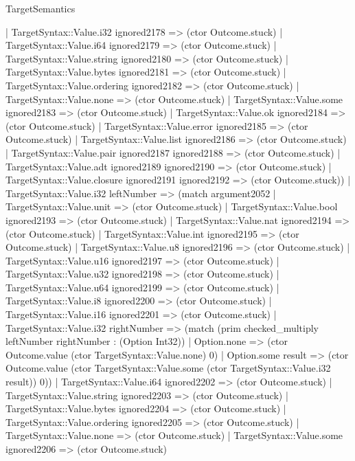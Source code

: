 \begin{lexlean}{TargetSemantics}
\begin{semanticmodule}
{              | TargetSyntax::Value.i32 ignored2178 => (ctor Outcome.stuck)
              | TargetSyntax::Value.i64 ignored2179 => (ctor Outcome.stuck)
              | TargetSyntax::Value.string ignored2180 => (ctor Outcome.stuck)
              | TargetSyntax::Value.bytes ignored2181 => (ctor Outcome.stuck)
              | TargetSyntax::Value.ordering ignored2182 => (ctor Outcome.stuck)
              | TargetSyntax::Value.none => (ctor Outcome.stuck)
              | TargetSyntax::Value.some ignored2183 => (ctor Outcome.stuck)
              | TargetSyntax::Value.ok ignored2184 => (ctor Outcome.stuck)
              | TargetSyntax::Value.error ignored2185 => (ctor Outcome.stuck)
              | TargetSyntax::Value.list ignored2186 => (ctor Outcome.stuck)
              | TargetSyntax::Value.pair ignored2187 ignored2188 => (ctor Outcome.stuck)
              | TargetSyntax::Value.adt ignored2189 ignored2190 => (ctor Outcome.stuck)
              | TargetSyntax::Value.closure ignored2191 ignored2192 => (ctor Outcome.stuck))
            | TargetSyntax::Value.i32 leftNumber => (match argument2052
              | TargetSyntax::Value.unit => (ctor Outcome.stuck)
              | TargetSyntax::Value.bool ignored2193 => (ctor Outcome.stuck)
              | TargetSyntax::Value.nat ignored2194 => (ctor Outcome.stuck)
              | TargetSyntax::Value.int ignored2195 => (ctor Outcome.stuck)
              | TargetSyntax::Value.u8 ignored2196 => (ctor Outcome.stuck)
              | TargetSyntax::Value.u16 ignored2197 => (ctor Outcome.stuck)
              | TargetSyntax::Value.u32 ignored2198 => (ctor Outcome.stuck)
              | TargetSyntax::Value.u64 ignored2199 => (ctor Outcome.stuck)
              | TargetSyntax::Value.i8 ignored2200 => (ctor Outcome.stuck)
              | TargetSyntax::Value.i16 ignored2201 => (ctor Outcome.stuck)
              | TargetSyntax::Value.i32 rightNumber => (match (prim checked_multiply leftNumber rightNumber : (Option Int32))
                | Option.none => (ctor Outcome.value (ctor TargetSyntax::Value.none) 0)
                | Option.some result => (ctor Outcome.value (ctor TargetSyntax::Value.some (ctor TargetSyntax::Value.i32 result)) 0))
              | TargetSyntax::Value.i64 ignored2202 => (ctor Outcome.stuck)
              | TargetSyntax::Value.string ignored2203 => (ctor Outcome.stuck)
              | TargetSyntax::Value.bytes ignored2204 => (ctor Outcome.stuck)
              | TargetSyntax::Value.ordering ignored2205 => (ctor Outcome.stuck)
              | TargetSyntax::Value.none => (ctor Outcome.stuck)
              | TargetSyntax::Value.some ignored2206 => (ctor Outcome.stuck)
}
\end{semanticmodule}
\end{lexlean}
